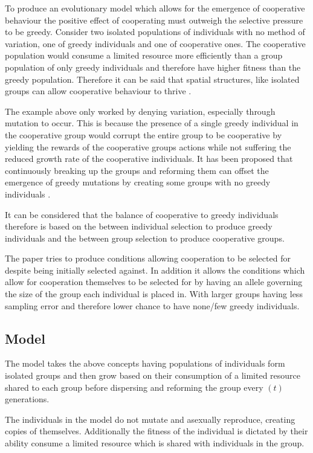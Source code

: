 \documentclass[a4paper,10pt, twocolumn]{article}
\begin{document}
To produce an evolutionary model which allows for the emergence of cooperative behaviour the positive effect of cooperating must outweigh the selective pressure to be greedy. Consider two isolated populations of individuals with no method of variation, one of greedy individuals and one of cooperative ones. The cooperative population would consume a limited resource more efficiently than a group population of only greedy individuals and therefore have higher fitness than the greedy population. Therefore it can be said that spatial structures, like isolated groups can allow cooperative behaviour to thrive \cite{Bacteria1,Bacteria2,Bacteria3,SpatialStructure}. 

The example above only worked by denying variation, especially through mutation to occur. This is because the presence of a single greedy individual in the cooperative group would corrupt the entire group to be cooperative by yielding the rewards of the cooperative groups actions while not suffering the reduced growth rate of the cooperative individuals. It has been proposed that continuously breaking up the groups and reforming them can offset the emergence of greedy mutations by creating some groups with no greedy individuals \cite{GroupSelection1,GroupSelection2,GroupSelection3}. 

It can be considered that the balance of cooperative to greedy individuals therefore is based on the between individual selection to produce greedy individuals and the between group selection to produce cooperative groups. 


The paper tries to produce conditions allowing cooperation to be selected for despite being initially selected against. In addition it allows the conditions which allow for cooperation themselves to be selected for by having an allele governing the size of the group each individual is placed in. With larger groups having less sampling error and therefore lower chance to have none/few greedy individuals. 

\subsection{Model}

The model takes the above concepts having populations of individuals form isolated groups and then grow based on their consumption of a limited resource shared to each group before dispersing and reforming the group every $(t)$ generations. 

The individuals in the model do not mutate and asexually reproduce, creating copies of themselves. Additionally the fitness of the individual is dictated by their ability consume a limited resource which is shared with individuals in the group.
\end{document}
